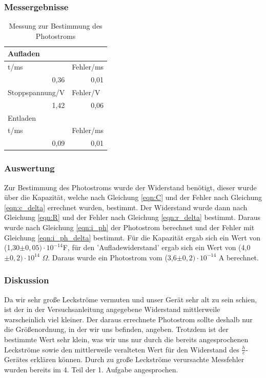 \documentclass[12px]{scrartcl}
\begin{document}
\subsubsection{Messergebnisse}
\begin{table}[H]
\caption{Messung zur Bestimmung des Photostroms}
\begin{center}
\begin{tabular}{|l|l|}
\hline
Aufladen &  \\ \hline
t/ms & Fehler/ms \\ \hline
\multicolumn{1}{|r|}{0,36} & \multicolumn{1}{r|}{0,01} \\ \hline
Stoppspannung/V & Fehler/V \\ \hline
\multicolumn{1}{|r|}{1,42} & \multicolumn{1}{r|}{0,06} \\ \hline
Entladen &  \\ \hline
t/ms & Fehler/ms \\ \hline
\multicolumn{1}{|r|}{0,09} & \multicolumn{1}{r|}{0,01} \\ \hline
\end{tabular}
\end{center}
\label{tab:a_2.1}
\end{table}


\subsubsection{Auswertung}
Zur Bestimmung des Photostroms wurde der Widerstand benötigt, dieser wurde über die Kapazität, welche nach Gleichung \ref{eqn:C} und der Fehler nach Gleichung \ref{eqn:c_delta} errechnet wurden, bestimmt. Der Widerstand wurde dann nach Gleichung \ref{eqn:R} und der Fehler nach Gleichung \ref{eqn:r_delta} bestimmt. Daraus wurde nach Gleichung \ref{eqn:i_ph} der Photostrom berechnet und der Fehler mit Gleichung \ref{eqn:i_ph_delta} bestimmt. Für die Kapazität ergab sich ein Wert von (1,30$\pm 0,05)\cdot10^{-14}$F, für den 'Aufladewiderstand' ergab sich ein Wert von (4,0$\pm 0,2)\cdot10^{14}$ $\Omega$. Daraus wurde ein Photostrom vom (3,6$\pm 0,2)\cdot10^{-14}$ A berechnet.

\subsubsection{Diskussion}
Da wir sehr große Leckströme vermuten und unser Gerät sehr alt zu sein schien, ist der in der Versuchsanleitung angegebene Widerstand  mittlerweile warscheinlich viel kleiner. Der daraus errechnete Photostrom sollte deshalb nur die Größenordnung, in der wir uns befinden, angeben. Trotzdem ist der bestimmte Wert sehr klein, was wir uns nur durch die bereits angesprochenen Leckströme sowie den mittlerweile veralteten Wert für den Widerstand des $\frac{h}{e}$-Gerätes erklären können. Durch zu große Leckströme verursachte Messfehler wurden bereits im 4. Teil der 1. Aufgabe angesprochen.
\end{document}

